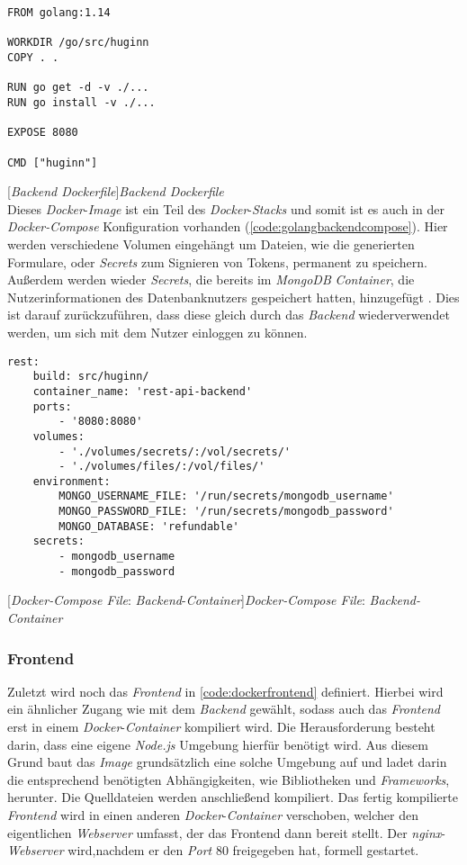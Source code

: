 \begin{verbatim}
FROM golang:1.14
	
WORKDIR /go/src/huginn
COPY . .
	
RUN go get -d -v ./...
RUN go install -v ./...
	
EXPOSE 8080
	
CMD ["huginn"]
\end{verbatim}
[\textit{Backend Dockerfile}]{\textit{Backend Dockerfile}}
\label{code:backgodocker}
~\\
Dieses \textit{Docker}-\textit{Image} ist ein Teil des \textit{Docker}-\textit{Stacks} und somit ist es auch in der \textit{Docker-Compose} Konfiguration vorhanden (\autoref{code:golangbackendcompose}). Hier werden verschiedene Volumen eingehängt um Dateien, wie die generierten Formulare, oder \textit{Secrets} zum Signieren von Tokens, permanent zu speichern. Außerdem werden wieder \textit{Secrets}, die bereits im \textit{MongoDB} \textit{Container}, die Nutzerinformationen des Datenbanknutzers gespeichert hatten, hinzugefügt \cite{secretmongo}. Dies ist darauf zurückzuführen, dass diese gleich durch das \textit{Backend} wiederverwendet werden, um sich mit dem Nutzer einloggen zu können.

\begin{verbatim}
rest:
	build: src/huginn/
	container_name: 'rest-api-backend'
	ports:
		- '8080:8080'
	volumes:
		- './volumes/secrets/:/vol/secrets/'
		- './volumes/files/:/vol/files/'
	environment:
		MONGO_USERNAME_FILE: '/run/secrets/mongodb_username'
		MONGO_PASSWORD_FILE: '/run/secrets/mongodb_password'
		MONGO_DATABASE: 'refundable'
	secrets:
		- mongodb_username
		- mongodb_password
\end{verbatim}
[\textit{Docker-Compose File}: \textit{Backend}-\textit{Container}]{\textit{Docker-Compose File}: \textit{Backend-Container}}
\label{code:golangbackendcompose}

\newpage

\subsubsection{Frontend}

Zuletzt wird noch das \textit{Frontend} in \autoref{code:dockerfrontend} definiert. Hierbei wird ein ähnlicher Zugang wie mit dem \textit{Backend} gewählt, sodass auch das \textit{Frontend} erst in einem \textit{Docker}-\textit{Container} kompiliert wird. Die Herausforderung besteht darin, dass eine eigene \textit{Node.js} Umgebung hierfür benötigt wird. Aus diesem Grund baut das \textit{Image} grundsätzlich eine solche Umgebung auf und ladet darin die entsprechend benötigten Abhängigkeiten, wie Bibliotheken und \textit{Frameworks}, herunter. Die Quelldateien werden anschließend kompiliert. Das fertig kompilierte \textit{Frontend} wird in einen anderen \textit{Docker}-\textit{Container} verschoben, welcher den eigentlichen \textit{Webserver} umfasst, der das Frontend dann bereit stellt. Der \textit{nginx}-\textit{Webserver} wird,nachdem er den \textit{Port} 80 freigegeben hat, formell gestartet.

